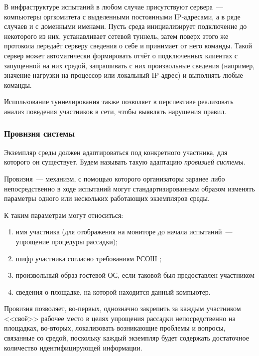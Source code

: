 В инфраструктуре испытаний в любом случае присутствуют сервера~--- компьютеры оргкомитета с выделенными постоянными IP-адресами, а в ряде случаев и с доменными именами. Пусть среда инициализирует подключение до некоторого из них, устанавливает сетевой туннель, затем поверх этого же протокола передаёт серверу сведения о себе и принимает от него команды. Такой сервер может автоматически формировать отчёт о подключенных клиентах с запущенной на них средой, запрашивать с них произвольные сведения (например, значение нагрузки на процессор или локальный IP-адрес) и выполнять любые команды.

Использование туннелирования также позволяет в перспективе реализовать анализ поведения участников в сети, чтобы выявлять нарушения правил.


\subsubsection{Провизия системы}
\label{cha:ana:provision}

Экземпляр среды должен адаптироваться под конкретного участника, для которого он существует. Будем называть такую адаптацию \textit{провизией системы.}

Провизия~--- механизм, с помощью которого организаторы заранее либо непосредственно в ходе испытаний могут стандартизированным образом изменять параметры одного или нескольких работающих экземпляров среды.

К таким параметрам могут относиться:
\begin{enumerate}
\item имя участника (для отображения на мониторе до начала испытаний~--- упрощение процедуры рассадки);
\item шифр участника согласно требованиям РСОШ \cite{Rosolymp};
\item произвольный образ гостевой ОС, если таковой был предоставлен участником
\item сведения о площадке, на которой находится данный компьютер.
\end{enumerate}

Провизия позволяет, во-первых, однозначно закрепить за каждым участником <<своё>> рабочее место в целях упрощения рассадки непосредственно на площадках, во-вторых, локализовать возникающие проблемы и вопросы, связанные со средой, поскольку каждый экземпляр будет содержать достаточное количество идентифицирующей информации.

